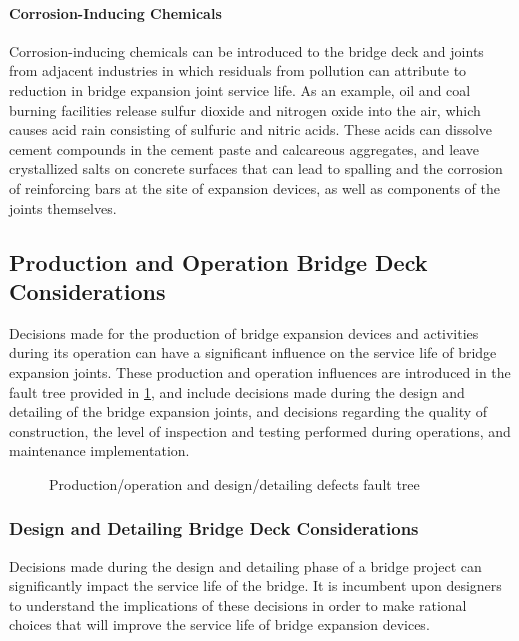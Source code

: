 \paragraph*{Corrosion-Inducing Chemicals}
Corrosion-inducing chemicals can be introduced to the bridge deck and joints from adjacent industries in which
residuals from pollution can attribute to reduction in bridge expansion joint service life. As an example, oil and coal burning facilities release sulfur dioxide and nitrogen oxide into the air, which causes acid rain consisting of sulfuric
and nitric acids. These acids can dissolve cement compounds in the cement paste and calcareous aggregates, and
leave crystallized salts on concrete surfaces that can lead to spalling and the corrosion of reinforcing bars at the site
of expansion devices, as well as components of the joints themselves.

\subsection{Production and Operation Bridge Deck Considerations}
Decisions made for the production of bridge expansion devices and activities during its operation can have a
significant influence on the service life of bridge expansion joints. These production and operation influences are
introduced in the fault tree provided in \cref{fig:faulttree-expansion-joint-operation}, and include decisions made during the design and detailing of the
bridge expansion joints, and decisions regarding the quality of construction, the level of inspection and testing
performed during operations, and maintenance implementation.

\begin{figure}
  \caption{Production/operation and design/detailing defects fault tree}
  \label{fig:faulttree-expansion-joint-operation}
\end{figure}

\subsubsection{Design and Detailing Bridge Deck Considerations}
Decisions made during the design and detailing phase of a bridge project can significantly impact the service life
of the bridge. It is incumbent upon designers to understand the implications of these decisions in order to make
rational choices that will improve the service life of bridge expansion devices.

